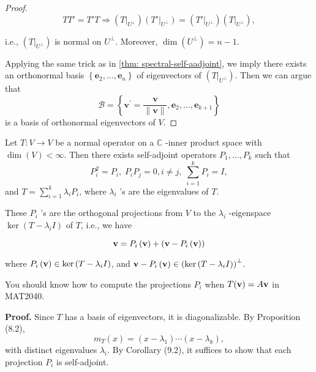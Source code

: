 \begin{proof}
\[
TT' = T'T \Rightarrow  \left( {\left. T\right| }_{{U}^{ \bot  }}\right) \left( {T'{\left. \right| }_{{U}^{ \bot  }}}\right)  = \left( {\left. T'\right| }_{{U}^{ \bot  }}\right) \left( {\left. T\right| }_{{U}^{ \bot  }}\right) ,
\]

i.e., \(\left( {\left. T\right| }_{{U}^{ \bot  }}\right)\) is normal on \({U}^{ \bot  }\). Moreover, \(\dim \left( {U}^{ \bot  }\right)  = n - 1\).

Applying the same trick as in \autoref{thm: spectral-self-aadjoint}, we imply there exists an orthonormal basis \(\left\{  {{\mathbf{e}}_{2},\ldots ,{\mathbf{e}}_{n}}\right\}\) of eigenvectors of \(\left( {\left. T\right| }_{{U}^{ \bot  }}\right)\). Then we can argue that
\[
\mathcal{B} = \left\{  {{\mathbf{v}}^{\prime } = \frac{\mathbf{v}}{\parallel \mathbf{v}\parallel} ,{\mathbf{e}}_{2},\ldots ,{\mathbf{e}}_{k + 1}}\right\}
\]
is a basis of orthonormal eigenvectors of \(V\).
\end{proof}

\begin{corollary}\label{cor:spectral-theorem-normal-operators}
Let \(T : V \rightarrow  V\) be a normal operator on a \(\mathbb{C}\) -inner product space with \(\dim \left( V\right)  < \infty\). Then there exists self-adjoint operators \({P}_{1},\ldots ,{P}_{k}\) such that
\[
{P}_{i}^{2} = {P}_{i},\;{P}_{i}{P}_{j} = 0,i \neq  j,\;\mathop{\sum }\limits_{{i = 1}}^{k}{P}_{i} = I,
\]
and \(T = \mathop{\sum }\limits_{{i = 1}}^{k}{\lambda }_{i}{P}_{i}\), where \({\lambda }_{i}\) ’s are the eigenvalues of \(T\).

These \({P}_{i}\) ’s are the orthogonal projections from \(V\) to the \(\lambda_{i}\) -eigenspace \(\ker (T - \lambda_{i}I)\) of \(T\), i.e., we have

\[
{\bf v} = {P}_{i}\left({\bf  v}\right)  + \left( {{\bf v} - {P}_{i}\left({\bf  v}\right) }\right)
\]

where \({P}_{i}\left({\bf  v}\right)  \in  \ker \left( {T - {\lambda }_{i}I}\right)\), and \({\bf v} - {P}_{i}\left({\bf  v}\right)  \in  {\left( \ker \left( T - {\lambda }_{i}I\right) \right) }^{ \bot  }\).
\end{corollary}
You should know how to compute the projections \( P_i \) when \( T({\bf v}) = A{\bf v} \) in MAT2040.

\textbf{Proof.}
Since \( T \) has a basis of eigenvectors, it is diagonalizable. By Proposition (8.2),
\[
m_T(x) = (x - \lambda_1) \cdots (x - \lambda_k),
\]
with distinct eigenvalues \( \lambda_i \). By Corollary (9.2), it suffices to show that each projection \( P_i \) is self-adjoint.

